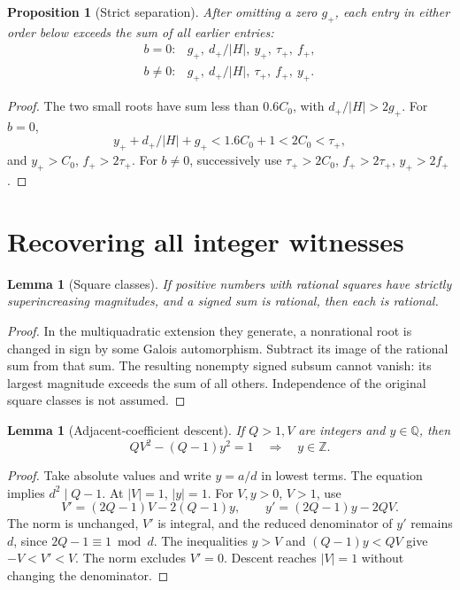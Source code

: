 \documentclass[11pt,a4paper]{article}
\newtheorem{lemma}[theorem]{Lemma}
\newtheorem{proposition}[theorem]{Proposition}
\theoremstyle{definition}\newtheorem{definition}[theorem]{Definition}
\theoremstyle{remark}\newtheorem{remark}[theorem]{Remark}
\newcommand{\Z}{\mathbb Z}\newcommand{\Q}{\mathbb Q}\newcommand{\N}{\mathbb N}
\numberwithin{equation}{section}
\begin{document}
\begin{proposition}[Strict separation]\label{prop:separation}
After omitting a zero \(g_+\), each entry in either order below exceeds
the sum of all earlier entries:
\[
\begin{array}{ll}
b=0:&g_+,\ d_+/|H|,\ y_+,\ \tau_+,\ f_+,\\
b\ne0:&g_+,\ d_+/|H|,\ \tau_+,\ f_+,\ y_+.
\end{array}
\]
\end{proposition}
\begin{proof}
The two small roots have sum less than \(0.6C_0\), with
\(d_+/|H|>2g_+\). For \(b=0\),
\[
y_++d_+/|H|+g_+<1.6C_0+1<2C_0<\tau_+,
\]
and \(y_+>C_0\), \(f_+>2\tau_+\).
For \(b\ne0\), successively use
\(\tau_+>2C_0\), \(f_+>2\tau_+\), \(y_+>2f_+\).
\end{proof}

\section{Recovering all integer witnesses}\label{sec:kernel}

\begin{lemma}[Square classes]\label{lem:radicals}
If positive numbers with rational squares have strictly superincreasing
magnitudes, and a signed sum is rational, then each is rational.
\end{lemma}
\begin{proof}
In the multiquadratic extension they generate, a nonrational root is
changed in sign by some Galois automorphism. Subtract its image of
the rational sum from that sum. The resulting nonempty signed
subsum cannot vanish: its largest magnitude exceeds the sum of all
others. Independence of the original square classes is not assumed.
\end{proof}

\begin{lemma}[Adjacent-coefficient descent]\label{lem:descent}
If \(Q>1,V\) are integers and \(y\in\Q\), then
\[
QV^2-(Q-1)y^2=1\quad\Longrightarrow\quad y\in\Z.
\]
\end{lemma}
\begin{proof}
Take absolute values and write \(y=a/d\) in lowest terms.
The equation implies \(d^2\mid Q-1\). At \(|V|=1\), \(|y|=1\).
For \(V,y>0\), \(V>1\), use
\[
V'=(2Q-1)V-2(Q-1)y,\qquad y'=(2Q-1)y-2QV.
\]
The norm is unchanged, \(V'\) is integral, and the reduced
denominator of \(y'\) remains \(d\), since \(2Q-1\equiv1\bmod d\).
The inequalities \(y>V\) and \((Q-1)y<QV\) give
\(-V<V'<V\). The norm excludes \(V'=0\).
Descent reaches \(|V|=1\) without changing the denominator.
\end{proof}
\end{document}
